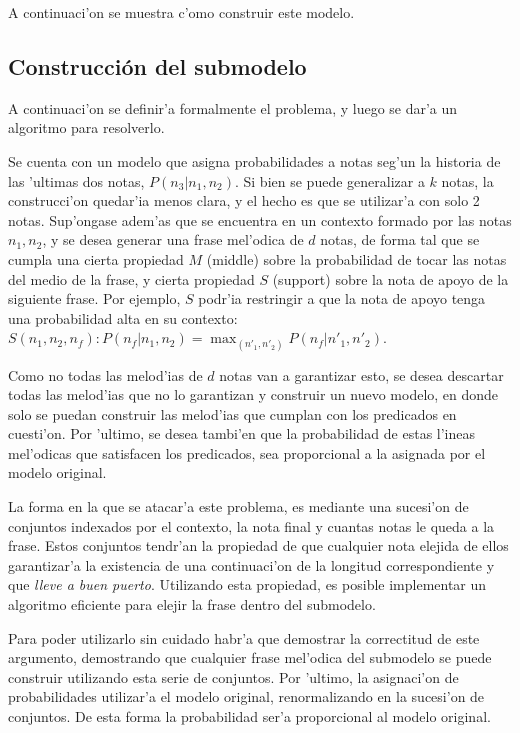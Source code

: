 A continuaci'on se muestra c'omo construir este modelo. 


\subsection{Construcci\'on del submodelo}
\label{sec:phrase_model}
A continuaci'on se definir'a formalmente el problema, y luego se dar'a un algoritmo para resolverlo.

Se cuenta con un modelo que asigna probabilidades a notas seg'un la historia de las 'ultimas dos notas, $P(n_3 | n_1, n_2)$. Si bien se puede generalizar a $k$ notas,
la construcci'on quedar'ia menos clara, y el hecho es que se utilizar'a con solo 2 notas. Sup'ongase adem'as que se encuentra en un contexto formado por las notas 
$n_1, n_2$, y se desea generar una frase mel'odica de $d$ notas, de forma tal que se cumpla una cierta propiedad $M$ (middle) sobre la probabilidad de tocar las notas
del medio de la frase, y cierta propiedad $S$ (support) sobre la nota de apoyo de la siguiente frase. Por ejemplo, $S$ podr'ia restringir a 
que la nota de apoyo tenga una probabilidad alta en su contexto: $S(n_1, n_2, n_f): P(n_f | n_1, n_2) = \max_{(n'_1, n'_2)}{P(n_f | n'_1, n'_2)}$.

Como no todas las melod'ias de $d$ notas van a garantizar esto, se desea descartar todas las melod'ias que no lo garantizan y construir un nuevo modelo, en donde
solo se puedan construir las melod'ias que cumplan con los predicados en cuesti'on. Por 'ultimo, se desea tambi'en que la probabilidad de estas l'ineas mel'odicas 
que satisfacen los predicados, sea proporcional a la asignada por el modelo original. 

La forma en la que se atacar'a este problema, es mediante una sucesi'on de conjuntos indexados por el contexto, la nota final y cuantas notas le queda
a la frase. Estos conjuntos tendr'an la propiedad de que cualquier nota elejida de ellos garantizar'a la existencia de una continuaci'on de la longitud correspondiente 
 y que \emph{lleve a buen puerto}. Utilizando esta propiedad, es posible implementar un algoritmo eficiente para elejir la frase dentro del submodelo. 

Para poder utilizarlo sin cuidado habr'a que demostrar la correctitud de este argumento, demostrando que cualquier frase mel'odica del submodelo se puede construir
utilizando esta serie de conjuntos. Por 'ultimo, la asignaci'on de probabilidades utilizar'a el modelo original, renormalizando en la sucesi'on de conjuntos. De esta 
forma la probabilidad ser'a proporcional al modelo original.

